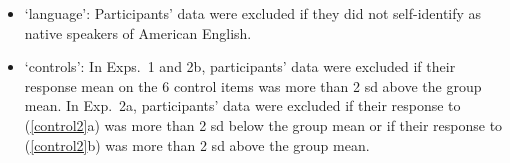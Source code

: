 \documentclass[11pt,fleqn]{article}
\newcommand{\jt}[1]{\textbf{\color{blue}JT: #1}}
\newcommand{\6}{\mbox{$[\hspace*{-.6mm}[$}}
\newcommand{\9}{\mbox{$]\hspace*{-.6mm}]$}}
\begin{document}
\begin{itemize}[topsep = -1ex,itemsep=-2pt]


\item `language': Participants' data were excluded if they did not self-identify as native speakers of American English.

\item `controls': In Exps.~1 and 2b, participants' data were excluded if their response mean on the 6 control items was more than 2 sd above the group mean. In Exp.~2a, participants' data were excluded  if their response to (\ref{control2}a) was more than 2 sd below the group mean or if their response to (\ref{control2}b) was more than 2 sd above the group mean.


\end{itemize}


\end{document}
